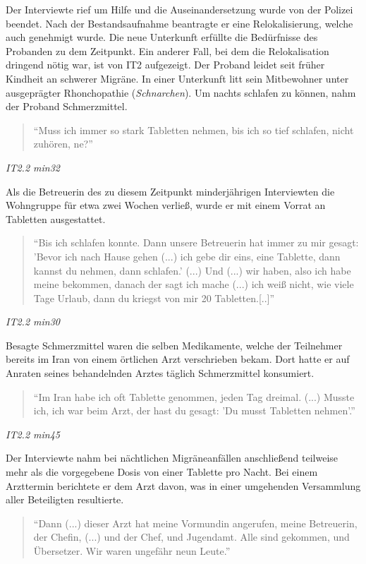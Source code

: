 Der Interviewte rief um Hilfe und die Auseinandersetzung wurde von der Polizei beendet.  Nach der Bestandsaufnahme beantragte er eine Relokalisierung, welche auch genehmigt wurde. Die neue Unterkunft erfüllte die Bedürfnisse des Probanden zu dem Zeitpunkt.\newline
Ein anderer Fall, bei dem die Relokalisation dringend nötig war, ist von IT2 aufgezeigt. Der Proband leidet seit früher Kindheit an schwerer Migräne. In einer Unterkunft litt sein Mitbewohner unter ausgeprägter Rhonchopathie (\textit{Schnarchen}). Um nachts schlafen zu können, nahm der Proband Schmerzmittel.
\begin{quote}
    ``Muss ich immer so stark Tabletten nehmen, bis ich so tief schlafen, nicht zuhören, ne?''
\end{quote}
\centerline{\textit{IT2.2 min32}}
Als die Betreuerin des zu diesem Zeitpunkt minderjährigen Interviewten die Wohngruppe für etwa zwei Wochen verließ, wurde er mit einem Vorrat an Tabletten ausgestattet.\newline
\begin{quote}
    ``Bis ich schlafen konnte. Dann unsere Betreuerin hat immer zu mir gesagt: 'Bevor ich nach Hause gehen (...) ich gebe dir eins, eine Tablette, dann kannst du nehmen, dann schlafen.' (...) Und (...) wir haben, also ich habe meine bekommen, danach der sagt ich mache (...) ich weiß nicht, wie viele Tage Urlaub, dann du kriegst von mir 20 Tabletten.[..]''
\end{quote}
\centerline{\textit{IT2.2 min30}}
Besagte Schmerzmittel waren die selben Medikamente, welche der Teilnehmer bereits im Iran von einem örtlichen Arzt verschrieben bekam. Dort hatte er auf Anraten seines behandelnden Arztes täglich Schmerzmittel konsumiert.
\begin{quote}
    ``Im Iran habe ich oft Tablette genommen, jeden Tag dreimal. (...) Musste ich, ich war beim Arzt, der hast du gesagt: 'Du musst Tabletten nehmen'.''
\end{quote}
\centerline{\textit{IT2.2 min45}}
Der Interviewte nahm bei nächtlichen Migräneanfällen anschließend teilweise mehr als die vorgegebene Dosis von einer Tablette pro Nacht. Bei einem Arzttermin berichtete er dem Arzt davon, was in einer umgehenden Versammlung aller Beteiligten resultierte.
\begin{quote}
    ``Dann (...) dieser Arzt hat meine Vormundin angerufen, meine Betreuerin, der Chefin, (...) und der Chef, und Jugendamt. Alle sind gekommen, und Übersetzer. Wir waren ungefähr neun Leute.''
\end{quote}

